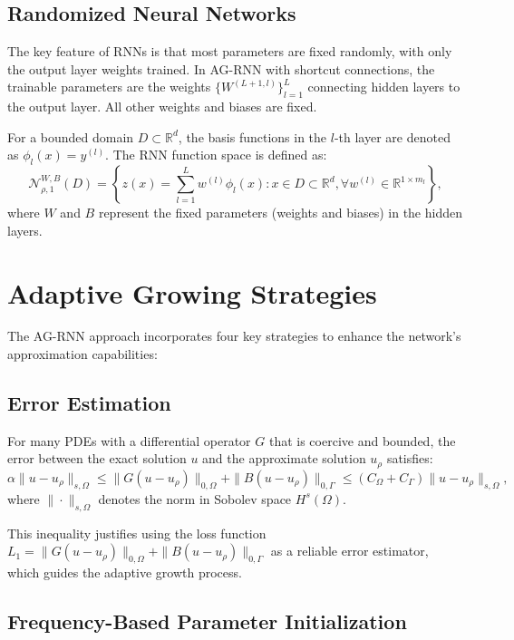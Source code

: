 \documentclass[11pt,a4paper]{article}
\begin{document}
\subsection{Randomized Neural Networks}

The key feature of RNNs is that most parameters are fixed randomly, with only the output layer weights trained. In AG-RNN with shortcut connections, the trainable parameters are the weights $\{W^{(L+1,l)}\}_{l=1}^L$ connecting hidden layers to the output layer. All other weights and biases are fixed.

For a bounded domain $D \subset \mathbb{R}^d$, the basis functions in the $l$-th layer are denoted as $\phi_l(x) = y^{(l)}$. The RNN function space is defined as:
\begin{equation}
\mathcal{N}^{W,B}_{\rho,1}(D) = \left\{z(x) = \sum_{l=1}^{L} w^{(l)}\phi_l(x) : x \in D \subset \mathbb{R}^d, \forall w^{(l)}\in \mathbb{R}^{1 \times m_l}\right\},
\end{equation}
where $W$ and $B$ represent the fixed parameters (weights and biases) in the hidden layers.

\section{Adaptive Growing Strategies}

The AG-RNN approach incorporates four key strategies to enhance the network's approximation capabilities:

\subsection{Error Estimation}

For many PDEs with a differential operator $G$ that is coercive and bounded, the error between the exact solution $u$ and the approximate solution $u_\rho$ satisfies:
\begin{equation}
\alpha\|u-u_\rho\|_{s,\Omega} \leq \|G(u-u_\rho)\|_{0,\Omega} + \|B(u-u_\rho)\|_{0,\Gamma} \leq (C_\Omega+C_\Gamma)\|u-u_\rho\|_{s,\Omega},
\end{equation}
where $\|\cdot\|_{s,\Omega}$ denotes the norm in Sobolev space $H^s(\Omega)$.

This inequality justifies using the loss function $L_1 = \|G(u-u_\rho)\|_{0,\Omega} + \|B(u-u_\rho)\|_{0,\Gamma}$ as a reliable error estimator, which guides the adaptive growth process.

\subsection{Frequency-Based Parameter Initialization}
\end{document}
